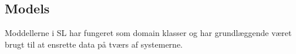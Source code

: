 \subsection{Models}
Moddellerne i \gls{SL} har fungeret som domain klasser og har grundlæggende været brugt til at ensrette data på tværs af systemerne.


